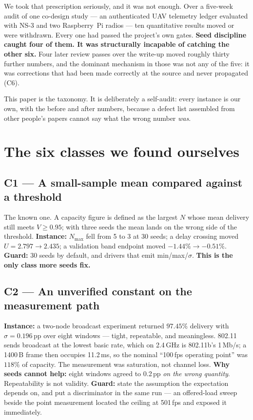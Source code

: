 \documentclass[conference]{IEEEtran}
\begin{document}
We took that prescription seriously, and it was not enough. Over a five-week audit of one
co-design study --- an authenticated UAV telemetry ledger evaluated with NS-3 and two Raspberry~Pi
radios --- ten quantitative results moved or were withdrawn. Every one had passed the project's own
gates. \textbf{Seed discipline caught four of them. It was structurally incapable of catching the
other six.} Four later review passes over the write-up moved roughly thirty further numbers, and
the dominant mechanism in those was not any of the five: it was corrections that had been made
correctly at the source and never propagated (C6).

This paper is the taxonomy. It is deliberately a self-audit: every instance is our own, with the
before and after numbers, because a defect list assembled from other people's papers cannot say what
the wrong number \emph{was}.

\section{The six classes we found ourselves}

\subsection{C1 --- A small-sample mean compared against a threshold}
The known one. A capacity figure is defined as the largest $N$ whose mean delivery still meets
$V \geq 0.95$; with three seeds the mean lands on the wrong side of the threshold.
\textbf{Instance:} $N_{\max}$ fell from 5 to 3 at 30 seeds; a delay crossing moved
$U{=}2.797 \to 2.435$; a validation band endpoint moved $-1.44\% \to -0.51\%$.
\textbf{Guard:} 30 seeds by default, and drivers that emit min/max/$\sigma$.
\textbf{This is the only class more seeds fix.}

\subsection{C2 --- An unverified constant on the measurement path}
\textbf{Instance:} a two-node broadcast experiment returned $97.45\%$ delivery with
$\sigma = 0.196$\,pp over eight windows --- tight, repeatable, and meaningless. 802.11 sends
broadcast at the lowest basic rate, which on 2.4\,GHz is 802.11b's 1\,Mb/s; a 1400\,B frame then
occupies 11.2\,ms, so the nominal ``100\,fps operating point'' was $118\%$ of capacity. The
measurement was saturation, not channel loss.
\textbf{Why seeds cannot help:} eight windows agreed to 0.2\,pp \emph{on the wrong quantity}.
Repeatability is not validity.
\textbf{Guard:} state the assumption the expectation depends on, and put a discriminator in the same
run --- an offered-load sweep beside the point measurement located the ceiling at 501\,fps and
exposed it immediately.
\end{document}
